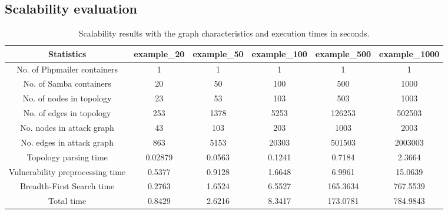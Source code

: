 \subsection{Scalability evaluation}
\label{chap:scalability_eval}


\begin{table*}
	\begin{center}
		\begin{tabular}{ cccccc } 
			\hline
			Statistics & example\_20 & example\_50 & example\_100 & example\_500 & example\_1000 \\ \hline
			
			No. of Phpmailer containers & 1 & 1 & 1 & 1 & 1 \\ 
			
			No. of Samba containers & 20 & 50 & 100 & 500 & 1000 \\ 
			
			No. of nodes in topology & 23 & 53 & 103 & 503 & 1003\\ 
			
			No. of edges in topology & 253 & 1378 & 5253 & 126253 & 502503 \\ 
			
			No. nodes in attack graph & 43 & 103 & 203 & 1003 & 2003 \\ 
			
			No. edges in attack graph & 863 & 5153 & 20303 & 501503 & 2003003 \\ 
			
			Topology parsing time & 0.02879 & 0.0563 & 0.1241 & 0.7184 & 2.3664 \\ 
			
			Vulnerability preprocessing time & 0.5377 & 0.9128 & 1.6648 & 6.9961 & 15.0639 \\ 
			
			Breadth-First Search time & 0.2763 & 1.6524 & 6.5527 & 165.3634 & 767.5539 \\ 
			
			Total time & 0.8429 & 2.6216 & 8.3417 & 173.0781 & 784.9843 \\ 
			\hline
		\end{tabular}
	\end{center}
	
	\caption{Scalability results with the graph characteristics and execution times in seconds.}
	
	\label{table_scalability}
\end{table*}
